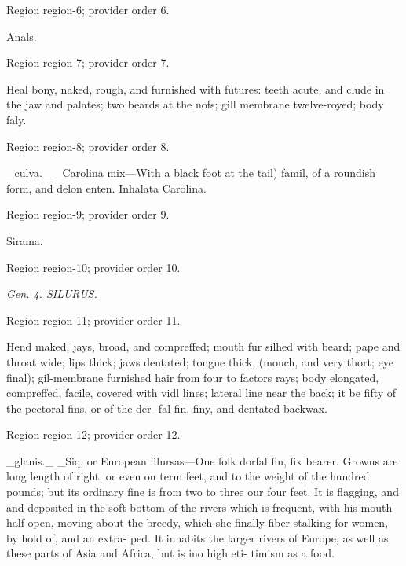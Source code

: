 \documentclass[11pt]{article}
\begin{document}
{\scriptsize\color{gray} Region region-6; provider order 6.\par}
\medskip

Anals.
\par

{\scriptsize\color{gray} Region region-7; provider order 7.\par}
\medskip

Heal bony, naked, rough, and furnished with futures:
teeth acute, and clude in the jaw and palates; two
beards at the nofs; gill membrane twelve-royed;
body faly.
\par

{\scriptsize\color{gray} Region region-8; provider order 8.\par}
\medskip

\_culva.\_ \_Carolina mix—With a black foot at the tail)
famil, of a roundish form, and delon enten. Inhalata
Carolina.
\par

{\scriptsize\color{gray} Region region-9; provider order 9.\par}
\medskip

Sirama.
\par

{\scriptsize\color{gray} Region region-10; provider order 10.\par}
\medskip

{\small\itshape Gen. 4. SILURUS.\par}

{\scriptsize\color{gray} Region region-11; provider order 11.\par}
\medskip

Hend maked, jays, broad, and compreffed; mouth fur
silhed with beard; pape and throat wide; lips thick;
jaws dentated; tongue thick, (mouch, and very thort;
eye final); gil-membrane furnished hair from four
to factors rays; body elongated, compreffed, facile, covered with vidl lines; lateral line near the
back; it be fifty of the pectoral fins, or of the der-
fal fin, finy, and dentated backwax.
\par

{\scriptsize\color{gray} Region region-12; provider order 12.\par}
\medskip

\_glanis.\_ \_Siq, or European filursas—One folk dorfal fin, fix
bearer. Growns are long length of right, or even on
term feet, and to the weight of the hundred pounds;
but its ordinary fine is from two to three our four feet.
It is flagging, and and deposited in the soft
bottom of the rivers which is frequent, with his mouth
half-open, moving about the breedy, which she finally
fiber stalking for women, by hold of, and an extra-
ped. It inhabits the larger rivers of Europe, as well
as these parts of Asia and Africa, but is ino high eti-
timism as a food.
\par
\end{document}
